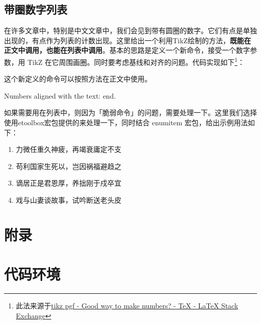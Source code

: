 \subsection{带圈数字列表}

在许多文章中，特别是中文文章中，我们会见到带有圆圈的数字。它们有点是单独出现的，有点作为列表的计数出现。这里给出一个利用TikZ绘制的方法，\textbf{既能在正文中调用，也能在列表中调用}。基本的思路是定义一个新命令，接受一个数字参数，用 TikZ 在它周围画圈。同时要考虑基线和对齐的问题。代码实现如下\footnote{此法来源于\href{http://tex.stackexchange.com/questions/7032/good-way-to-make-textcircled-numbers}{tikz pgf - Good way to make  numbers? - TeX - LaTeX Stack Exchange}}：

\begin{latex}
\usepackage{tikz}
\usepackage{etoolbox}
\newcommand{\circled}[2][]{\tikz[baseline=(char.base)]
    {\node[shape = circle, draw, inner sep = 1pt]
        (char) {\phantom{\ifblank{#1}{#2}{#1}}};%
        \node at (char.center) {\makebox[0pt][c]{#2}};}}
\robustify{\circled}
\end{latex}

这个新定义的命令可以按照方法在正文中使用。

\begin{codeshow}
Numbers aligned with the text:     end.
\end{codeshow}

如果需要用在列表中，则因为「脆弱命令」的问题，需要处理一下。这里我们选择使用etoolbox宏包提供的来处理一下，同时结合 enumitem 宏包，给出示例用法如下：

\begin{codeshow}
\begin{enumerate}[label=\dcircled{\arabic*}, noitemsep]
    \item 力微任重久神疲，再竭衰庸定不支
    \item 苟利国家生死以，岂因祸福避趋之
    \item 谪居正是君恩厚，养拙刚于戍卒宜
    \item 戏与山妻谈故事，试吟断送老头皮
\end{enumerate}
\end{codeshow}


\section{附录}

\section{代码环境}

